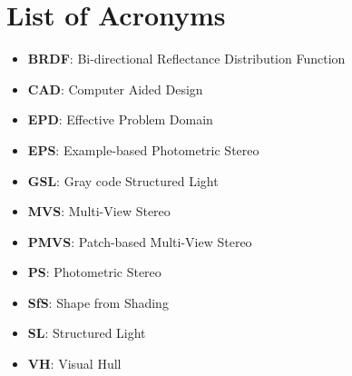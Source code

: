 
\chapter{List of Acronyms}

\begin{itemize}
\item \textbf{BRDF}: Bi-directional Reflectance Distribution Function
\item \textbf{CAD}: Computer Aided Design
\item \textbf{EPD}: Effective Problem Domain
\item \textbf{EPS}: Example-based Photometric Stereo
\item \textbf{GSL}: Gray code Structured Light
\item \textbf{MVS}: Multi-View Stereo
\item \textbf{PMVS}: Patch-based Multi-View Stereo
\item \textbf{PS}: Photometric Stereo
\item \textbf{SfS}: Shape from Shading
\item \textbf{SL}: Structured Light
\item \textbf{VH}: Visual Hull
\end{itemize}